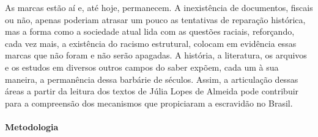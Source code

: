 \documentclass[12pt]{extarticle}
\begin{document}

As marcas estão aí e, até hoje, permanecem. A inexistência de documentos,
fiscais ou não, apenas poderiam atrasar um pouco as tentativas de
reparação histórica, mas a forma como a sociedade atual lida com as
questões raciais, reforçando, cada vez mais, a existência do racismo
estrutural, colocam em evidência essas marcas que não foram e não serão
apagadas. A história, a literatura, os arquivos e os estudos em diversos
outros campos do saber expõem, cada um à sua maneira, a permanência
dessa barbárie de séculos. Assim, a articulação dessas áreas a partir da
leitura dos textos de Júlia Lopes de Almeida pode contribuir para a
compreensão dos mecanismos que propiciaram a escravidão no Brasil.

\paragraph{Metodologia}
\end{document}
